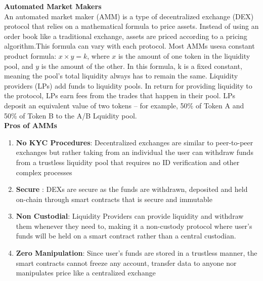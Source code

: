 \documentclass[10pt]{article}
\begin{document}
\textbf{Automated Market Makers}\\

An automated market maker (AMM) is a type of decentralized exchange (DEX) protocol that relies on a mathematical formula to price assets. Instead of using an order book like a traditional exchange, assets are priced according to a pricing algorithm.This formula can vary with each protocol. Most AMMs usesa constant product formula: $x  \times  y = k$, where $x$ is the amount of one token in the liquidity pool, and $y$ is the amount of the other. In this formula, k is a fixed constant, meaning the pool’s total liquidity always has to remain the same. Liquidity providers (LPs) add funds to liquidity pools. In return for providing liquidity to the protocol, LPs earn fees from the trades that happen in their pool. LPs deposit an equivalent value of two tokens – for example, 50\% of Token A and 50\% of Token B to the A/B Lquidity pool.\\

\textbf{Pros of AMMs}
\begin{enumerate}[leftmargin=+0.2in]
\item \textbf{No KYC Procedures}: Decentralized exchanges are similar to peer-to-peer exchanges but rather taking from an individual the user can withdraw funds from a trustless liquidity pool that requires no ID verification and other complex processes
\item \textbf{Secure} : DEXs are secure as the funds are withdrawn, deposited and held on-chain through smart contracts that is secure and immutable
\item \textbf{Non Custodial}: Liquidity Providers can provide liquidity and withdraw them whenever they need to, making it a non-custody protocol where user's funds will be held on a smart contract rather than a central custodian.
\item \textbf{Zero Manipulation}: Since user's funds are stored in a trustless manner, the smart contracts cannot freeze any account, transfer data to anyone nor manipulates price like a centralized exchange
\end{enumerate}
\end{document}

